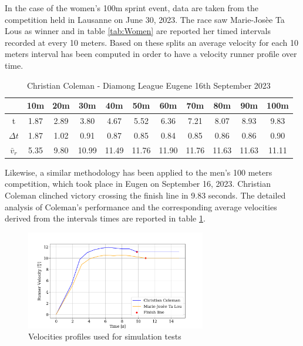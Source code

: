\documentclass[a4paper,12pt,oneside]{book}
\begin{document}
\bigskip
In the case of the women's 100m sprint event, data are taken from the competition held in Lausanne on June 30, 2023.  
The race saw Marie-Josèe Ta Lous as winner and in table \ref{tab:Women} are reported her timed intervals recorded at every 10 meters. 
Based on these splits an average velocity for each 10 meters interval has been computed in order to have a velocity runner profile over time.

\begin{table}[h!]
	\centering
	\begin{adjustbox}{max width=\textwidth}
	\begin{tabular}{c|c|c|c|c|c|c|c|c|c|c}
           & 10m & 20m & 30m & 40m & 50m & 60m & 70m & 80m & 90m &100m \\
	\hline
	\hline
	t & 1.87 & 2.89 & 3.80 & 4.67 & 5.52 & 6.36 & 7.21 & 8.07 & 8.93 & 9.83  \\	
	$\Delta t$ & 1.87 & 1.02 & 0.91 & 0.87 & 0.85 & 0.84 & 0.85 & 0.86 & 0.86 & 0.90 \\
	$\bar{v}_r$ & 5.35 & 9.80 & 10.99 & 11.49 & 11.76 & 11.90 & 11.76 & 11.63 & 11.63 & 11.11 \\
	\hline
	\end{tabular}
	\end{adjustbox}
\caption{Christian Coleman - Diamong League Eugene 16th September 2023}
\label{tab:Man}
\end{table}

Likewise, a similar methodology has been applied to the men's 100 meters competition, which took place in Eugen on September 16, 2023.
Christian Coleman clinched victory crossing the finish line in 9.83 seconds.
The detailed analysis of Coleman's performance and the corresponding average velocities derived from the intervals times are reported in table \ref{tab:Man}.

\begin{figure}[!h]
	\centering
	\includegraphics[width=0.7\textwidth]{Test_Velocities.png}
\caption{Velocities profiles used for simulation tests}
\label{Test_Velocities}
\end{figure}
\end{document}
